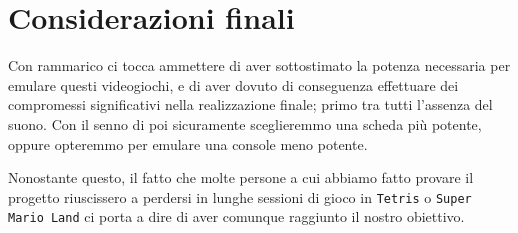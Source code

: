 \documentclass[hidelinks,12pt]{article}
\begin{document}
\section{Considerazioni finali}

Con rammarico ci tocca ammettere di aver sottostimato la potenza necessaria per
emulare questi videogiochi, e di aver dovuto di conseguenza effettuare dei
compromessi significativi nella realizzazione finale; primo tra tutti l'assenza
del suono. Con il senno di poi sicuramente sceglieremmo una scheda più potente,
oppure opteremmo per emulare una console meno potente.

Nonostante questo, il fatto che molte persone a cui abbiamo fatto provare il
progetto riuscissero a perdersi in lunghe sessioni di gioco in \texttt{Tetris}
o \texttt{Super Mario Land} ci porta a dire di aver comunque raggiunto il
nostro obiettivo.


\nocite{*}
\printbibliography
\end{document}
